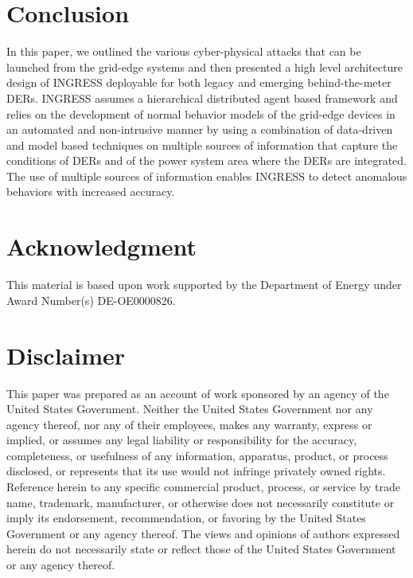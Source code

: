 \documentclass[conference]{IEEEtran}
\begin{document}
\section{Conclusion}
\label{sec:conclusion}
In this paper, we outlined the various cyber-physical attacks that can be launched from the grid-edge systems and then presented a high level architecture design of INGRESS deployable for both  legacy and emerging behind-the-meter DERs.  INGRESS assumes a hierarchical distributed agent based framework and relies on the development of normal behavior models of the grid-edge devices in an automated and non-intrusive manner by using a combination of data-driven and model based techniques on multiple sources of information that capture the conditions of DERs and of the power system area where the DERs are integrated. The use of multiple sources of information enables INGRESS to detect anomalous behaviors with increased accuracy.

\section*{Acknowledgment}
This material is based upon work supported by the Department of Energy under Award Number(s) DE-OE0000826.
\section*{Disclaimer}
This paper was prepared as an account of work sponsored by an agency of the United States Government.  Neither the United States Government nor any agency thereof, nor any of their employees, makes any warranty, express or implied, or assumes any legal liability or responsibility for the accuracy, completeness, or usefulness of any information, apparatus, product, or process disclosed, or represents that its use would not infringe privately owned rights.  Reference herein to any specific commercial product, process, or service by trade name, trademark, manufacturer, or otherwise does not necessarily constitute or imply its endorsement, recommendation, or favoring by the United States Government or any agency thereof.  The views and opinions of authors expressed herein do not necessarily state or reflect those of the United States Government or any agency thereof.





\end{document}

